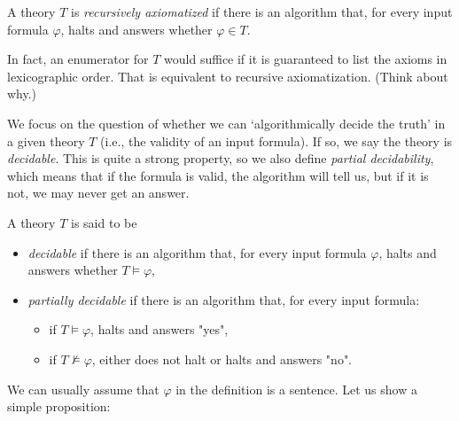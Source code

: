 \begin{definition}
    A theory $T$ is \emph{recursively axiomatized} if there is an algorithm that, for every input formula $\varphi$, halts and answers whether $\varphi \in T$.
\end{definition}

\begin{remark}
    In fact, an enumerator for $T$ would suffice if it is guaranteed to list the axioms in lexicographic order. That is equivalent to recursive axiomatization. (Think about why.)
\end{remark}

We focus on the question of whether we can `algorithmically decide the truth' in a given theory $T$ (i.e., the validity of an input formula). If so, we say the theory is \emph{decidable}. This is quite a strong property, so we also define \emph{partial decidability}, which means that if the formula is valid, the algorithm will tell us, but if it is not, we may never get an answer.

\begin{definition}[Decidability]
A theory $T$ is said to be
\begin{itemize}
    \item \emph{decidable} if there is an algorithm that, for every input formula $\varphi$, halts and answers whether $T \models \varphi$,
    \item \emph{partially decidable} if there is an algorithm that, for every input formula:
    \begin{itemize}
        \item if $T \models \varphi$, halts and answers "yes",
        \item if $T \not\models \varphi$, either does not halt or halts and answers "no".
    \end{itemize}
\end{itemize}
\end{definition}
We can usually assume that $\varphi$ in the definition is a sentence. Let us show a simple proposition:

